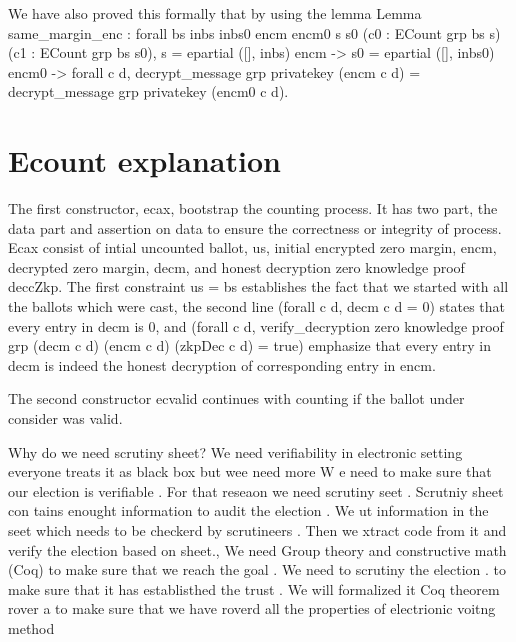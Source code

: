 We have also proved this formally that by using the lemma 
Lemma same_margin_enc :
      forall bs inbs inbs0 encm encm0 s s0 (c0 : ECount grp bs s) (c1 :  ECount grp bs s0),  
        s = epartial ([], inbs) encm ->
        s0 = epartial ([], inbs0) encm0 ->
        forall c d, decrypt_message grp privatekey (encm c d) =
               decrypt_message grp privatekey (encm0 c d). 
               
          

\section{Ecount explanation}
The first constructor, ecax, bootstrap the counting process. It has two part, the data part and assertion on data to 
ensure the correctness or integrity of process. Ecax consist of intial uncounted ballot, us, initial encrypted zero margin, 
encm, decrypted zero margin, decm, and honest decryption zero knowledge proof deccZkp. The first constraint us = bs 
establishes the fact that we started with all the ballots which were cast, the second line (forall c d, decm c d = 0) states 
that every entry in decm is 0, and (forall c d, verify_decryption zero knowledge proof grp (decm c d) (encm c d) (zkpDec c d) = true) 
emphasize that every entry in decm is indeed the honest decryption of corresponding entry in encm. 

The second constructor ecvalid continues with counting if the ballot under consider was valid. 








Why do we need scrutiny sheet? We need verifiability in electronic setting everyone treats 
it as black box but wee need more
W e need to make sure that our election is verifiable . For that reseaon we need scrutiny seet . Scrutniy sheet con
tains enought information to audit the election . We ut information in the seet which needs to be checkerd by 
scrutineers . Then we xtract code from it and verify the election based on sheet., 
We need Group theory and constructive math (Coq) to make sure that we reach the goal . We need to scrutiny 
the election . to make sure that it has establisthed the trust . We will formalized it Coq theorem rover a to make 
sure that we have roverd all the properties of electrionic voitng method 

